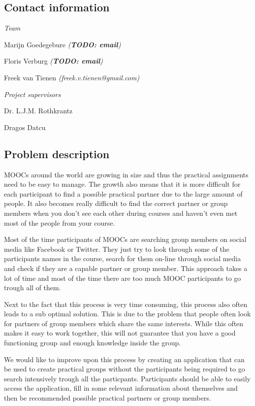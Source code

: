 \documentclass[]{article}
\newcommand{\TODO}[1]{{\color{red}\textbf{TODO: #1}}}
\begin{document}
\subsection{Contact information}
\emph{Team}

Marijn Goedegebure
\emph{(\TODO{email})}

Floris Verburg
\emph{(\TODO{email})}

Freek van Tienen
\emph{(freek.v.tienen@gmail.com)}

\noindent\emph{Project supervisors}

Dr. L.J.M. Rothkrantz

Dragos Datcu

\subsection{Problem description}
MOOCs around the world are growing in size and thus the practical assignments need to be easy to manage.
The growth also means that it is more difficult for each participant to find a possible practical partner due to the large amount of people.
It also becomes really difficult to find the correct partner or group members when you don't see each other during courses and haven't even met most of the people from your course.

Most of the time participants of MOOCs are searching group members on social media like Facebook or Twitter.
They just try to look through some of the participants names in the course, search for them on-line through social media and check if they are a capable partner or group member.
This approach takes a lot of time and most of the time there are too much MOOC participants to go trough all of them.

Next to the fact that this process is very time consuming, this process also often leads to a sub optimal solution.
This is due to the problem that people often look for partners of group members which share the same interests.
While this often makes it easy to work together, this will not guarantee that you have a good functioning group and enough knowledge inside the group.

We would like to improve upon this process by creating an application that can be used to create practical groups without the participants being required to go search intensively trough all the particpants.
Participants should be able to easily access the application, fill in some relevant information about themselves and then be recommended possible practical partners or group members.
\end{document}
